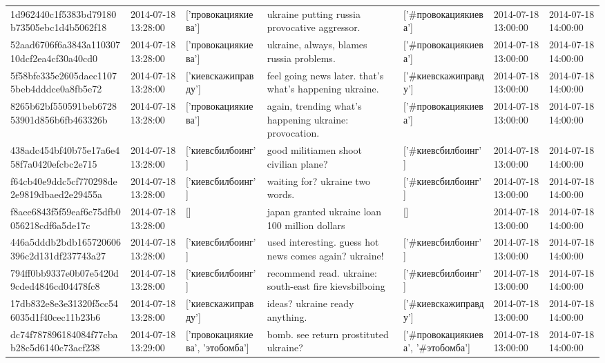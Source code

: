 \begin{tabular}{lllllll}
1d962440c1f5383bd79180b73505ebc1d4b5062f18 & 2014-07-18 13:28:00 & ['провокациякиева'] & ukraine putting russia provocative aggressor. & ['#провокациякиева'] & 2014-07-18 13:00:00 & 2014-07-18 14:00:00 \\
52aad6706f6a3843a11030710dcf2ea4cf30a40cd0 & 2014-07-18 13:28:00 & ['провокациякиева'] & ukraine, always, blames russia problems. & ['#провокациякиева'] & 2014-07-18 13:00:00 & 2014-07-18 14:00:00 \\
5f58bfe335e2605daec11075beb4dddce0a8fb5e72 & 2014-07-18 13:28:00 & ['киевскажиправду'] & feel going news later. that's what's happening ukraine. & ['#киевскажиправду'] & 2014-07-18 13:00:00 & 2014-07-18 14:00:00 \\
8265b62bf550591beb672853901d856b6fb463326b & 2014-07-18 13:28:00 & ['провокациякиева'] & again, trending what's happening ukraine: provocation. & ['#провокациякиева'] & 2014-07-18 13:00:00 & 2014-07-18 14:00:00 \\
438adc454bf40b75e17a6e458f7a0420efcbc2e715 & 2014-07-18 13:28:00 & ['киевсбилбоинг'] & good militiamen shoot civilian plane? & ['#киевсбилбоинг'] & 2014-07-18 13:00:00 & 2014-07-18 14:00:00 \\
f64cb40e9ddc5cf770298de2e9819dbaed2e29455a & 2014-07-18 13:28:00 & ['киевсбилбоинг'] & waiting for? ukraine two words. & ['#киевсбилбоинг'] & 2014-07-18 13:00:00 & 2014-07-18 14:00:00 \\
f8aee6843f5f59eaf6c75dfb0056218cdf6a5de17c & 2014-07-18 13:28:00 & [] & japan granted ukraine loan 100 million dollars & [] & 2014-07-18 13:00:00 & 2014-07-18 14:00:00 \\
446a5dddb2bdb165720606396c2d131df237743a27 & 2014-07-18 13:28:00 & ['киевсбилбоинг'] & used interesting. guess hot news comes again? ukraine! & ['#киевсбилбоинг'] & 2014-07-18 13:00:00 & 2014-07-18 14:00:00 \\
794ff0bb9337e0b07e5420d9cded4846cd04478fc8 & 2014-07-18 13:28:00 & ['киевсбилбоинг'] & recommend read. ukraine: south-east fire kievsbilboing & ['#киевсбилбоинг'] & 2014-07-18 13:00:00 & 2014-07-18 14:00:00 \\
17db832e8e3e31320f5cc546035d1f40cec11b23b6 & 2014-07-18 13:28:00 & ['киевскажиправду'] & ideas? ukraine ready anything. & ['#киевскажиправду'] & 2014-07-18 13:00:00 & 2014-07-18 14:00:00 \\
dc74f787896184084f77cbab28c5d6140c73acf238 & 2014-07-18 13:29:00 & ['провокациякиева', 'этобомба'] & bomb. see return prostituted ukraine? & ['#провокациякиева', '#этобомба'] & 2014-07-18 13:00:00 & 2014-07-18 14:00:00 \\

\end{tabular}
